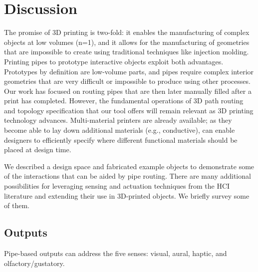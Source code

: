 \section{Discussion}
%

The promise of 3D printing is two-fold: it enables the manufacturing of complex objects at low volumes (n=1), and it allows for the manufacturing of geometries that are impossible to create using traditional techniques like injection molding.  Printing pipes to prototype interactive objects exploit both advantages. Prototypes by definition are low-volume parts, and pipes require complex interior geometries that are very difficult or impossible to produce using other processes. Our work has focused on routing pipes that are then later manually filled after a print has completed. However, the fundamental operations of 3D path routing and topology specification that our tool offers will remain relevant as 3D printing technology advances. Multi-material printers are already available; as they become able to lay down additional materials (e.g., conductive), \systemname can enable designers to efficiently specify where different functional materials should be placed at design time.

We described a design space and fabricated example objects to demonstrate some of the interactions that can be aided by pipe routing. There are many additional possibilities for leveraging sensing and actuation techniques from the HCI literature and extending their use in 3D-printed objects. We briefly survey some of them.

\subsection{Outputs}

Pipe-based outputs can address the five senses: visual, aural, haptic, and olfactory/gustatory.  %

